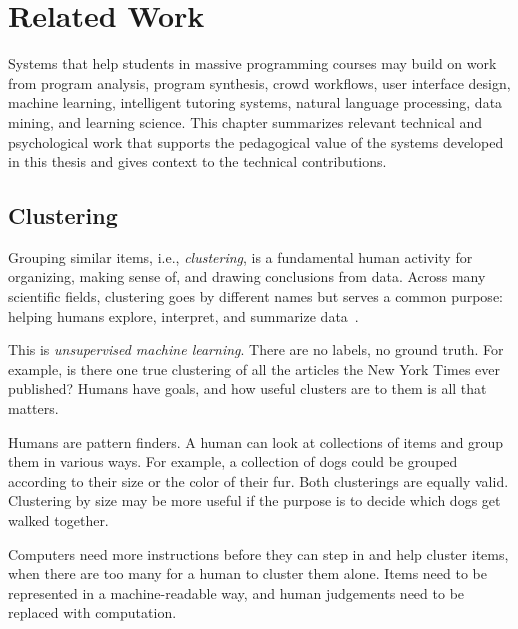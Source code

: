 \chapter{Related Work}\label{chapter:relatedwork}

Systems that help students in massive programming courses may build on work from program analysis, program synthesis, crowd workflows, user interface design, machine learning, intelligent tutoring systems, natural language processing, data mining, and learning science. This chapter summarizes relevant technical and psychological work that supports the pedagogical value of the systems developed in this thesis and gives context to the technical contributions. %


\section{Clustering}


Grouping similar items, i.e., {\it clustering}, is a fundamental human activity for organizing, making sense of, and drawing conclusions from data. Across many scientific fields, clustering goes by different names but serves a common purpose: helping humans explore, interpret, and summarize data~\cite{Jain50}.

This is {\it unsupervised machine learning}. There are no labels, no ground truth. For example, is there one true clustering of all the articles the New York Times ever published? Humans have goals, and how useful clusters are to them is all that matters.

Humans are pattern finders. A human can look at collections of items and group them in various ways. For example, a collection of dogs could be grouped according to their size or the color of their fur. Both clusterings are equally valid. Clustering by size may be more useful if the purpose is to decide which dogs get walked together.

Computers need more instructions before they can step in and help cluster items, when there are too many for a human to cluster them alone. Items need to be represented in a machine-readable way, and human judgements need to be replaced with computation.


